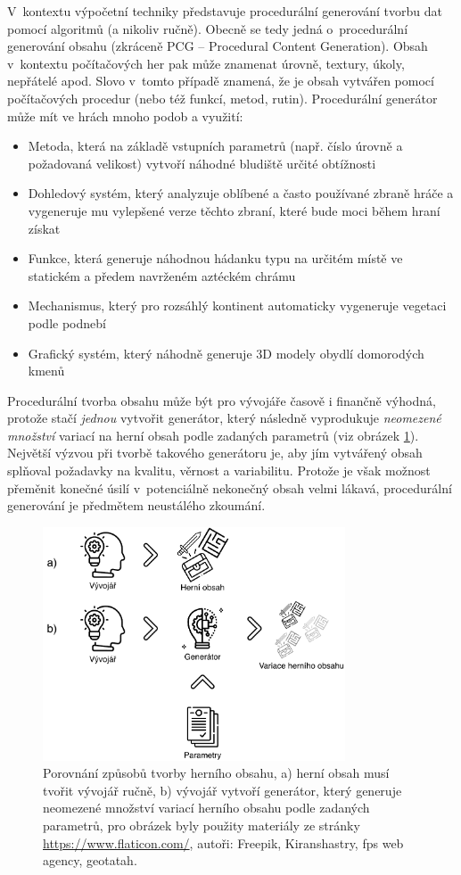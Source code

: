 V~kontextu výpočetní techniky představuje procedurální generování tvorbu dat pomocí algoritmů (a nikoliv ručně).
Obecně se tedy jedná o~procedurální generování obsahu (zkráceně PCG -- Procedural Content Generation).
Obsah v~kontextu počítačových her pak může znamenat úrovně, textury, úkoly, nepřátelé apod.
Slovo  v~tomto případě znamená, že je obsah vytvářen pomocí počítačových procedur (nebo též funkcí, metod, rutin)\cite{lit:pcg_definition}.
Procedurální generátor může mít ve hrách mnoho podob a využití:
\begin{itemize}
    \item Metoda, která na základě vstupních parametrů (např. číslo úrovně a požadovaná velikost) vytvoří náhodné bludiště určité obtížnosti
    \item Dohledový systém, který analyzuje oblíbené a často používané zbraně hráče a vygeneruje mu vylepšené verze těchto zbraní, které bude moci během hraní získat
    \item Funkce, která generuje náhodnou hádanku typu  na určitém místě ve statickém a předem navrženém aztéckém chrámu
    \item Mechanismus, který pro rozsáhlý kontinent automaticky vygeneruje vegetaci podle podnebí
    \item Grafický systém, který náhodně generuje 3D modely obydlí domorodých kmenů
\end{itemize}
Procedurální tvorba obsahu může být pro vývojáře časově i finančně výhodná, protože stačí \textit{jednou} vytvořit generátor, který následně vyprodukuje \textit{neomezené množství} variací na herní obsah podle zadaných parametrů (viz obrázek \ref{img:pcg_workflow}).
Největší výzvou při tvorbě takového generátoru je, aby jím vytvářený obsah splňoval požadavky na kvalitu, věrnost a variabilitu.
Protože je však možnost přeměnit konečné úsilí v~potenciálně nekonečný obsah velmi lákavá, procedurální generování je předmětem neustálého zkoumání.\begin{figure}[hbt]
    \centering
    \includegraphics[width=0.8\textwidth]{obrazky/pcg_workflow.pdf}
    \caption{Porovnání způsobů tvorby herního obsahu, a) herní obsah musí tvořit vývojář ručně, b) vývojář vytvoří generátor, který generuje neomezené množství variací herního obsahu podle zadaných parametrů, pro obrázek byly použity materiály ze stránky \url{https://www.flaticon.com/}, autoři: Freepik, Kiranshastry, fps web agency, geotatah.}
    \label{img:pcg_workflow}
\end{figure}


